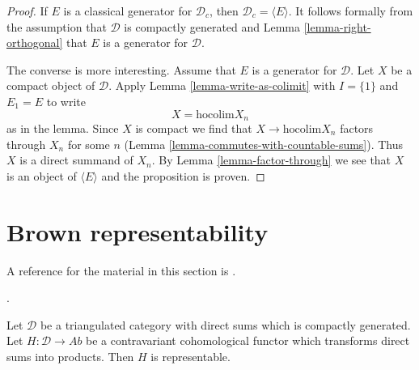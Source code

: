 \begin{proof}
If $E$ is a classical generator for $\mathcal{D}_c$, then
$\mathcal{D}_c = \langle E \rangle$. It follows formally
from the assumption that $\mathcal{D}$ is compactly generated
and Lemma \ref{lemma-right-orthogonal} that $E$ is a generator
for $\mathcal{D}$.

\medskip\noindent
The converse is more interesting. Assume that $E$ is a generator
for $\mathcal{D}$. Let $X$ be a compact object of $\mathcal{D}$.
Apply Lemma \ref{lemma-write-as-colimit} with $I = \{1\}$ and
$E_1 = E$ to write
$$
X = \text{hocolim} X_n
$$
as in the lemma. Since $X$ is compact we
find that $X \to \text{hocolim} X_n$ factors through $X_n$ for
some $n$ (Lemma \ref{lemma-commutes-with-countable-sums}).
Thus $X$ is a direct summand of $X_n$.
By Lemma \ref{lemma-factor-through} we see that $X$ is an
object of $\langle E \rangle$ and the proposition is proven.
\end{proof}











\section{Brown representability}
\label{section-brown}

\noindent
A reference for the material in this section is \cite{Neeman-Grothendieck}.

\begin{lemma}
\label{lemma-brown}
\begin{reference}
\cite[Theorem 3.1]{Neeman-Grothendieck}.
\end{reference}
Let $\mathcal{D}$ be a triangulated category with direct sums which is
compactly generated. Let $H : \mathcal{D} \to \textit{Ab}$ be a contravariant
cohomological functor which transforms direct sums into products.
Then $H$ is representable.
\end{lemma}

